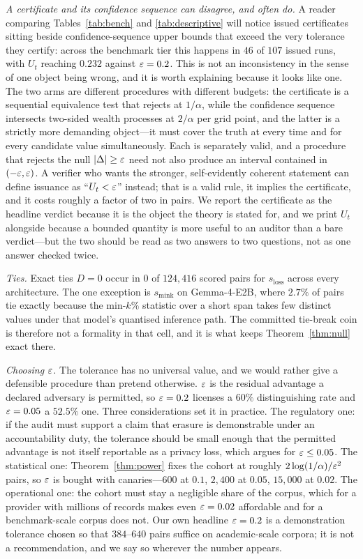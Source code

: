 \emph{A certificate and its confidence sequence can disagree, and often do.} A reader
comparing Tables~\ref{tab:bench} and \ref{tab:descriptive} will notice issued
certificates sitting beside confidence-sequence upper bounds that exceed the very
tolerance they certify: across the benchmark tier this happens in $46$ of $107$ issued
runs, with $U_t$ reaching $0.232$ against $\varepsilon = 0.2$. This is not an inconsistency in
the sense of one object being wrong, and it is worth explaining because it looks like
one. The two arms are different procedures with different budgets: the certificate is
a sequential equivalence test that rejects at $1/\alpha$, while the confidence
sequence intersects two-sided wealth processes at $2/\alpha$ per grid point, and the
latter is a strictly more demanding object---it must cover the truth at every time and
for every candidate value simultaneously. Each is separately valid, and a procedure
that rejects the null $|\Delta| \ge \varepsilon$ need not also produce an interval contained
in $(-\varepsilon, \varepsilon)$. A verifier who wants the stronger, self-evidently coherent
statement can define issuance as ``$U_t < \varepsilon$'' instead; that is a valid rule, it
implies the certificate, and it costs roughly a factor of two in pairs. We report the
certificate as the headline verdict because it is the object the theory is stated for,
and we print $U_t$ alongside because a bounded quantity is more useful to an auditor
than a bare verdict---but the two should be read as two answers to two questions, not
as one answer checked twice.

\emph{Ties.} Exact ties $D = 0$ occur in $0$ of $124{,}416$ scored pairs for
$s_{\mathrm{loss}}$ across every architecture. The one exception is $s_{\mathrm{mink}}$
on Gemma-4-E2B, where $2.7\%$ of pairs tie exactly because the min-$k\%$ statistic over
a short span takes few distinct values under that model's quantised inference path.
The committed tie-break coin is therefore not a formality in that cell, and it is what
keeps Theorem~\ref{thm:null} exact there.

\emph{Choosing $\varepsilon$.} The tolerance has no universal value, and we would rather give
a defensible procedure than pretend otherwise. $\varepsilon$ is the residual advantage a
declared adversary is permitted, so $\varepsilon = 0.2$ licenses a $60\%$ distinguishing rate
and $\varepsilon = 0.05$ a $52.5\%$ one. Three considerations set it in practice. The
regulatory one: if the audit must support a claim that erasure is demonstrable under
an accountability duty, the tolerance should be small enough that the permitted
advantage is not itself reportable as a privacy loss, which argues for
$\varepsilon \le 0.05$. The statistical one: Theorem~\ref{thm:power} fixes the cohort at
roughly $2\log(1/\alpha)/\varepsilon^2$ pairs, so $\varepsilon$ is bought with canaries---$600$ at
$0.1$, $2{,}400$ at $0.05$, $15{,}000$ at $0.02$. The operational one: the cohort must
stay a negligible share of the corpus, which for a provider with millions of records
makes even $\varepsilon = 0.02$ affordable and for a benchmark-scale corpus does not. Our own
headline $\varepsilon = 0.2$ is a demonstration tolerance chosen so that $384$--$640$ pairs
suffice on academic-scale corpora; it is not a recommendation, and we say so wherever
the number appears.

